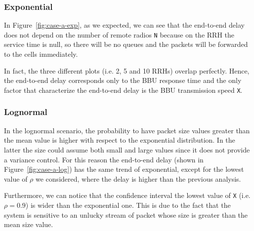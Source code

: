 \documentclass[11pt,a4paper,oneside, openright]{article}
\begin{document}
\subsubsection{Exponential}
In Figure~\ref{fig:case-a-exp}, as we expected, we can see that the end-to-end delay does not depend on the number of remote radios \texttt{N} because on the RRH the service time is null, so there will be no queues and the packets will be forwarded to the cells immediately.

In fact, the three different plots (i.e. 2, 5 and 10 RRHs) overlap perfectly.
Hence, the end-to-end delay corresponds only to the BBU response time and the only factor that characterize the end-to-end delay is the BBU transmission speed \texttt{X}.


\subsubsection{Lognormal}
In the lognormal scenario, the probability to have packet size values greater than the mean value is higher with respect to the exponential distribution. In the latter the size could assume both small and large values since it does not provide a variance control. For this reason the end-to-end delay (shown in Figure~\ref{fig:case-a-log}) has the same trend of exponential, except for the lowest value of $ \rho $ we considered, where the delay is higher than the previous analysis.

Furthermore, we can notice that the confidence interval the lowest value of \texttt{X} (i.e. $\rho = 0.9$) is wider than the exponential one. This is due to the fact that the system is sensitive to an unlucky stream of packet whose size is greater than the mean size value.
\end{document}
